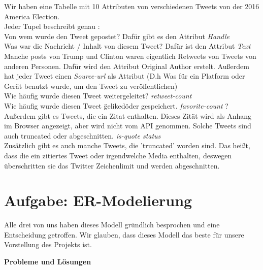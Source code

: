 Wir haben eine Tabelle mit 10 Attributen von verschiedenen Tweets von der 2016 America Election.\\
Jeder Tupel beschreibt genau :\\

Von wem wurde den Tweet gepostet? Dafür gibt es den Attribut {\itshape Handle}\\
Was war die Nachricht / Inhalt von diesem Tweet? Dafür ist den Attribut {\itshape Text}\\
Manche posts von Trump und Clinton waren eigentlich Retweets von Tweets von anderen Personen.
Dafür wird den Attribut Original Author erstelt.
Außerdem hat jeder Tweet einen {\itshape Source-url} als Attribut (D.h Was für ein Platform oder Gerät benutzt wurde, um den Tweet zu veröffentlichen)\\
Wie häufig wurde diesen Tweet weitergeleitet?  {\itshape retweet-count}\\
Wie häufig wurde diesen Tweet \"geliked\" oder gespeichert. {\itshape favorite-count }?\\

Außerdem gibt es Tweets, die ein Zitat enthalten. Dieses Zität wird als Anhang im Browser angezeigt, aber wird nicht vom API genommen. Solche Tweets sind auch truncated oder abgeschnitten. {\itshape is-quote status}\\
Zusätzlich gibt es auch manche Tweets, die 'truncated' worden sind. Das heißt, dass die ein zitiertes Tweet oder irgendwelche Media enthalten, deswegen überschritten sie das Twitter Zeichenlimit und werden abgeschnitten.\\ 

\section{Aufgabe: ER-Modelierung}

Alle drei von uns haben dieses Modell gründlich besprochen und eine Entscheidung getroffen. Wir glauben, dass dieses Modell das beste für unsere Vorstellung des Projekts ist.

\textbf{Probleme und Lösungen}\\

